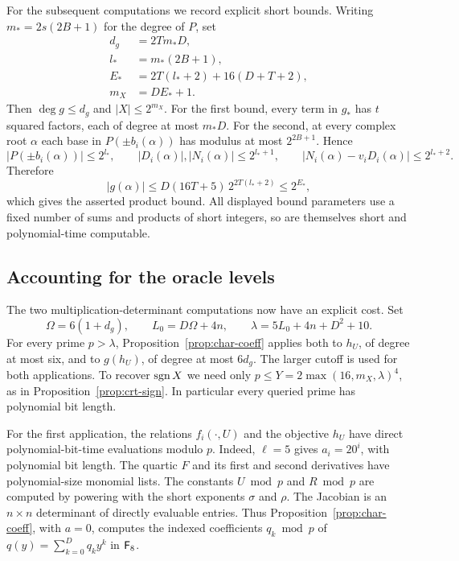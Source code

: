 For the subsequent computations we record explicit short bounds.
Writing $m_*=2s(2B+1)$ for the degree of $P$, set
\begin{equation}\label{eq:sparse-size-bounds}
 \begin{split}
 d_g&=2Tm_*D,\\
 l_*&=m_*(2B+1),\\
 E_*&=2T(l_*+2)+16(D+T+2),\\
 m_X&=DE_*+1.
 \end{split}
\end{equation}
Then $\deg g\le d_g$ and $|X|\le2^{m_X}$.
For the first bound, every term in $g_*$ has $t$ squared factors,
each of degree at most $m_*D$.  For the second, at every complex root
$\alpha$ each base in $P(\pm b_i(\alpha))$ has modulus at most
$2^{2B+1}$.  Hence
\[
 |P(\pm b_i(\alpha))|\le2^{l_*},\qquad
 |D_i(\alpha)|,|N_i(\alpha)|\le2^{l_*+1},\qquad
 |N_i(\alpha)-v_iD_i(\alpha)|\le2^{l_*+2}.
\]
Therefore
\[
 |g(\alpha)|\le D(16T+5)\,2^{2T(l_*+2)}\le2^{E_*},
\]
which gives the asserted product bound.  All displayed bound
parameters use a fixed number of sums and products of short integers,
so are themselves short and polynomial-time computable.

\subsection{Accounting for the oracle levels}

The two multiplication-determinant computations now have an explicit
cost.  Set
\[
 \Omega=6(1+d_g),\qquad L_0=D\Omega+4n,\qquad
 \lambda=5L_0+4n+D^2+10.
\]
For every prime $p>\lambda$, Proposition~\ref{prop:char-coeff}
applies both to $h_U$, of degree at most six, and to $g(h_U)$,
of degree at most $6d_g$.  The larger cutoff is used for both
applications.  To recover $\operatorname{sgn} X$ we need only
$p\le Y=2\max(16,m_X,\lambda)^4$, as in
Proposition~\ref{prop:crt-sign}.  In particular every queried prime
has polynomial bit length.

For the first application, the relations $f_i(\cdot,U)$ and
the objective $h_U$ have direct polynomial-bit-time evaluations
modulo $p$.  Indeed, $\ell=5$ gives $a_i=20^i$, with polynomial
bit length.  The quartic $F$ and its first and second derivatives
have polynomial-size monomial lists.  The constants
$U\bmod p$ and $R\bmod p$ are computed by powering with the short
exponents $\sigma$ and $\rho$.  The Jacobian is an $n\times n$
determinant of directly evaluable entries.  Thus
Proposition~\ref{prop:char-coeff}, with $a=0$, computes the indexed
coefficients $q_k\bmod p$ of $q(y)=\sum_{k=0}^{D}q_ky^k$ in
$\mathsf F_{8}$.

